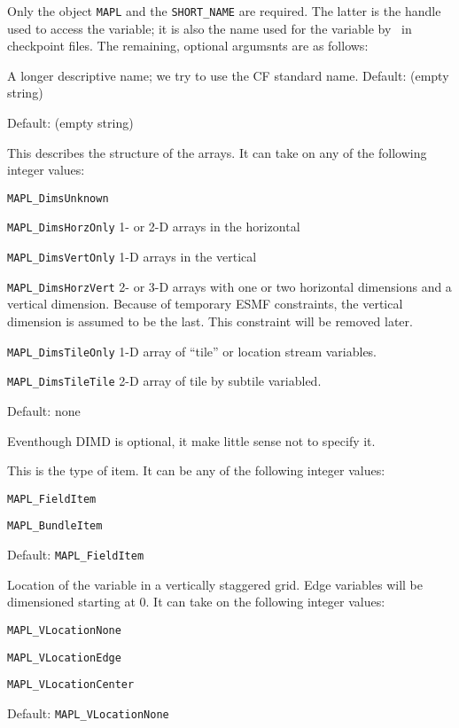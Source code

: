 Only the \ggn  object {\tt MAPL} and the {\tt SHORT\_NAME} are required. The
latter is the handle used to access the variable; it is also the name
used for the variable by \ggn\  in checkpoint files. The remaining,
optional argumsnts are as follows:

                   \parbox[t]{4in}{A longer descriptive name; we try
       to use the CF standard name. Default: (empty string)}

         \parbox[t]{4in}{ Default:  (empty string) }

         \parbox[t]{4in}{This describes the structure of the
  arrays. It can take on any of the following integer values:
\begin{description}
\item{\tt MAPL\_DimsUnknown}          
\item{\tt MAPL\_DimsHorzOnly}    1- or 2-D arrays in the horizontal
\item{\tt MAPL\_DimsVertOnly}    1-D arrays in the vertical
\item{\tt MAPL\_DimsHorzVert}    2- or 3-D arrays with one or two
    horizontal dimensions and a vertical dimension. Because of
    temporary ESMF constraints, the vertical dimension is assumed
    to be the last. This constraint will be removed later. 
\item{\tt MAPL\_DimsTileOnly}    1-D array of ``tile'' or location
    stream variables.
\item{\tt MAPL\_DimsTileTile}    2-D array of tile by subtile variabled.
\item Default: {none}
\end{description}
Eventhough DIMD is optional, it make little sense not to specify it.
}

  \parbox[t]{4in}{This is the type of item. It can be
    any of the following integer values:	    
\begin{description}
\item{\tt MAPL\_FieldItem}          
\item{\tt MAPL\_BundleItem}
\item       Default: {\tt MAPL\_FieldItem}
\end{description}
}

         \parbox[t]{4in}{Location of the variable in a vertically
 staggered grid. Edge variables will be dimensioned starting at 0.
 It can take on the following integer values:
\begin{description}
\item{\tt MAPL\_VLocationNone}         
\item{\tt MAPL\_VLocationEdge}         
\item{\tt MAPL\_VLocationCenter}       
\item Default: {\tt MAPL\_VLocationNone}
\end{description}
}

